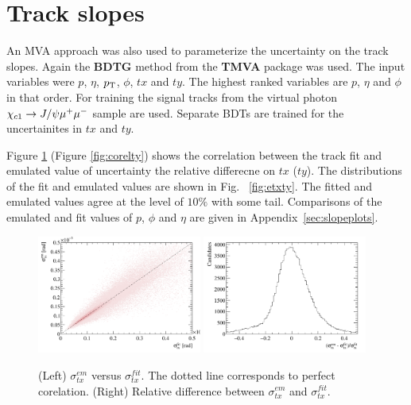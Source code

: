 \section{Track slopes}
\label{sec:slopesmva}
%
An MVA approach was also used to parameterize the uncertainty on the
track slopes. Again the \textbf{BDTG} method from the \textbf{TMVA}
package was used. The input variables were $p$, $\eta$, $p_{\mathrm{T}}$, $\phi$,
$tx$ and $ty$. The highest ranked variables are $p$, $\eta$ and $\phi$
in that order. For training the signal tracks from the virtual photon
${\chi_{{c} 1}} \rightarrow J/\psi \mu^+ \mu^-$ sample are used. Separate
BDTs are trained for the uncertainites in $tx$ and $ty$.

Figure \ref{fig:coreltx} (Figure \ref{fig:corelty}) shows the correlation between the track fit and emulated
value of uncertainty the relative differecne on $tx$ ($ty$). The
distributions of the fit and emulated values are shown in Fig. ~\ref{fig:etxty}. The fitted
and emulated values agree at the level of $10 \%$ with some
tail. Comparisons of the emulated and fit values of $p$, $\phi$ and
$\eta$ are given in Appendix~\ref{sec:slopeplots}. 
%
\begin{figure}[h!]
\centering
\includegraphics[width=0.48\textwidth]{figs/corelation-tx.pdf}
\includegraphics[width=0.48\textwidth]{figs/difference-tx.pdf}
\caption{(Left)  $\sigma^{em}_{tx}$  versus  $\sigma^{fit}_{tx}$. The dotted line
  corresponds to perfect corelation. (Right) Relative difference
  between $\sigma^{em}_{tx}$  and  $\sigma^{fit}_{tx}$.}
\label{fig:coreltx}
\end{figure}
%
%
